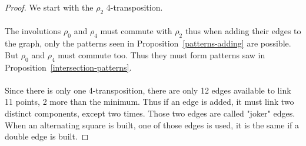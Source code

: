 \begin{proof}
  We start with the $\rho_2$ 4-transposition.

  \begin{figure}[H]
    \begin{center}
      \caption{}
    \end{center}
  \end{figure}

\paragraph{}
The involutions $\rho_0$ and $\rho_4$ must commute with $\rho_2$ thus when adding their edges to the graph, only the patterns seen in Proposition~\ref{patterns-adding} are possible. But $\rho_0$ and $\rho_4$ must commute too. Thus they must form patterns saw in Proposition~\ref{intersection-patterns}.

\paragraph{}
Since there is only one 4-transposition, there are only 12 edges available to link 11 points, 2 more than the minimum. Thus if an edge is added, it must link two distinct components, except two times. Those two edges are called "joker" edges. When an alternating square is built, one of those edges is used, it is the same if a double edge is built.


\end{proof}
